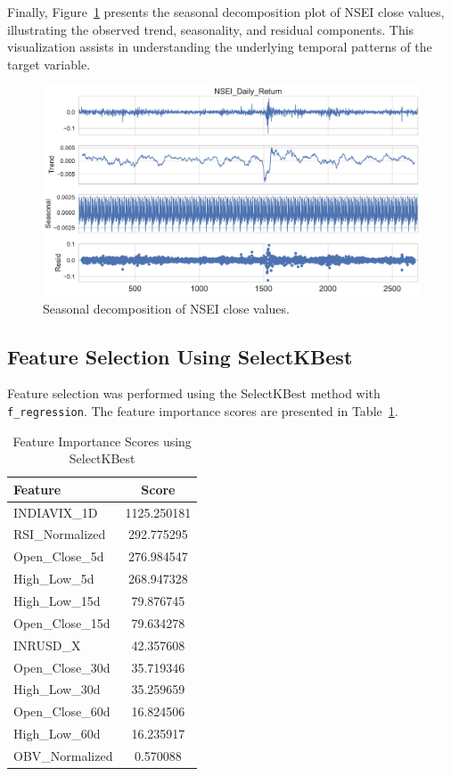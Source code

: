 Finally, Figure~\ref{fig:seasonal_decomposition} presents the seasonal decomposition plot of NSEI close values, illustrating the observed trend, seasonality, and residual components. This visualization assists in understanding the underlying temporal patterns of the target variable.

\begin{figure}[h!]
    \centering
    \includegraphics[width=\textwidth]{Images/seasonal_decomposition.pdf}
    \caption{Seasonal decomposition of NSEI close values.}
    \label{fig:seasonal_decomposition}
\end{figure}

\subsection{Feature Selection Using SelectKBest}
Feature selection was performed using the SelectKBest method with \texttt{f\_regression}. The feature importance scores are presented in Table~\ref{tab:feature_importance}.

\begin{table}[h!]
\centering
\caption{Feature Importance Scores using SelectKBest}
\begin{tabular}{|l|c|}
\hline
\textbf{Feature} & \textbf{Score} \\ \hline
INDIAVIX\_1D     & 1125.250181    \\ \hline
RSI\_Normalized  & 292.775295     \\ \hline
Open\_Close\_5d  & 276.984547     \\ \hline
High\_Low\_5d    & 268.947328     \\ \hline
High\_Low\_15d   & 79.876745      \\ \hline
Open\_Close\_15d & 79.634278      \\ \hline
INRUSD\_X        & 42.357608      \\ \hline
Open\_Close\_30d & 35.719346      \\ \hline
High\_Low\_30d   & 35.259659      \\ \hline
Open\_Close\_60d & 16.824506      \\ \hline
High\_Low\_60d   & 16.235917      \\ \hline
OBV\_Normalized  & 0.570088       \\ \hline
\end{tabular}

\label{tab:feature_importance}
\end{table}

